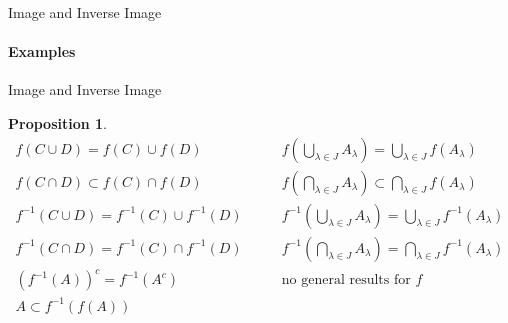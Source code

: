 \documentclass[9pt,aspectratio=169]{beamer}
\newtheorem{proposition}[theorem]{Proposition}
\begin{document}
\begin{frame}{Image and Inverse Image}
    \framesubtitle{Examples}
    
\end{frame}

\begin{frame}{Image and Inverse Image}
    \begin{proposition}
        \vspace{-2ex}
        \begin{align*}
            f(C \cup D) = f(C) \cup f(D) &\qquad f\left(\bigcup_{\lambda \in
                  J}A_\lambda\right) = \bigcup_{\lambda \in J} f(A_\lambda)\\
            f(C \cap D) \subset f(C) \cap f(D) &\qquad
            f\left(\bigcap_{\lambda \in J}A_\lambda\right) \subset
            \bigcap_{\lambda \in J} f(A_\lambda)\\
            f^{-1}(C \cup D) = f^{-1}(C) \cup f^{-1}(D) &\qquad
            f^{-1}\left(\bigcup_{\lambda \in J}A_\lambda\right) =
            \bigcup_{\lambda \in J} f^{-1}(A_\lambda)\\
            f^{-1}(C \cap D) = f^{-1}(C) \cap f^{-1}(D) &\qquad
            f^{-1}\left(\bigcap_{\lambda \in J}A_\lambda\right) =
            \bigcap_{\lambda \in J} f^{-1}(A_\lambda)\\
            (f^{-1}(A))^c = f^{-1}(A^c) &\qquad \text{no general results for
              $f$}\\
            A \subset f^{-1}\left(f(A)\right)
        \end{align*}
    \end{proposition}
\end{frame}
\end{document}
